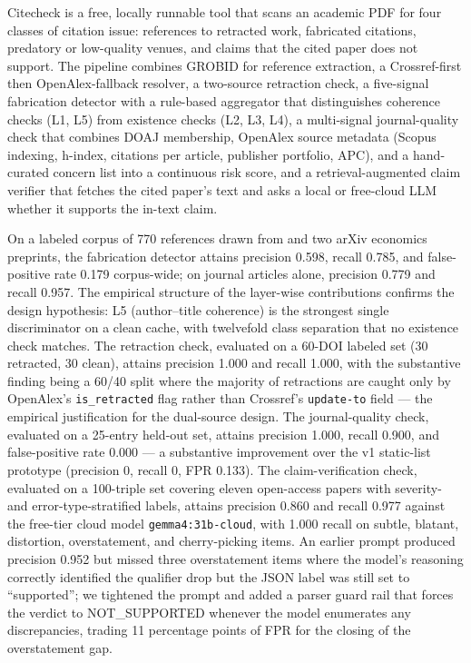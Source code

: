 \documentclass[12pt]{article}
\begin{document}
Citecheck is a free, locally runnable tool that scans an academic PDF for four classes of citation issue: references to retracted work, fabricated citations, predatory or low-quality venues, and claims that the cited paper does not support. The pipeline combines GROBID for reference extraction, a Crossref-first then OpenAlex-fallback resolver, a two-source retraction check, a five-signal fabrication detector with a rule-based aggregator that distinguishes coherence checks (L1, L5) from existence checks (L2, L3, L4), a multi-signal journal-quality check that combines DOAJ membership, OpenAlex source metadata (Scopus indexing, h-index, citations per article, publisher portfolio, APC), and a hand-curated concern list into a continuous risk score, and a retrieval-augmented claim verifier that fetches the cited paper's text and asks a local or free-cloud LLM whether it supports the in-text claim.

On a labeled corpus of 770 references drawn from \citet{walters_wilder_2023} and two arXiv economics preprints, the fabrication detector attains precision 0.598, recall 0.785, and false-positive rate 0.179 corpus-wide; on journal articles alone, precision 0.779 and recall 0.957. The empirical structure of the layer-wise contributions confirms the design hypothesis: L5 (author--title coherence) is the strongest single discriminator on a clean cache, with twelvefold class separation that no existence check matches. The retraction check, evaluated on a 60-DOI labeled set (30 retracted, 30 clean), attains precision 1.000 and recall 1.000, with the substantive finding being a 60/40 split where the majority of retractions are caught only by OpenAlex's \texttt{is\_retracted} flag rather than Crossref's \texttt{update-to} field --- the empirical justification for the dual-source design. The journal-quality check, evaluated on a 25-entry held-out set, attains precision 1.000, recall 0.900, and false-positive rate 0.000 --- a substantive improvement over the v1 static-list prototype (precision 0, recall 0, FPR 0.133). The claim-verification check, evaluated on a 100-triple set covering eleven open-access papers with severity- and error-type-stratified labels, attains precision 0.860 and recall 0.977 against the free-tier cloud model \texttt{gemma4:31b-cloud}, with 1.000 recall on subtle, blatant, distortion, overstatement, and cherry-picking items. An earlier prompt produced precision 0.952 but missed three overstatement items where the model's reasoning correctly identified the qualifier drop but the JSON label was still set to ``supported''; we tightened the prompt and added a parser guard rail that forces the verdict to NOT\_SUPPORTED whenever the model enumerates any discrepancies, trading 11 percentage points of FPR for the closing of the overstatement gap.
\end{document}
